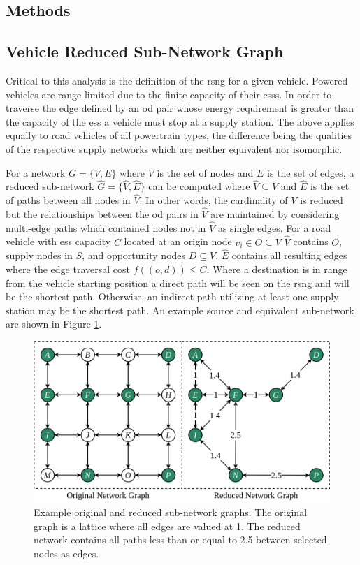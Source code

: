 \documentclass[11pt]{article}
\begin{document}
\begin{multicols}{2}
\section*{Methods}

\subsection*{Vehicle Reduced Sub-Network Graph}

Critical to this analysis is the definition of the \gls{rsng} for a given vehicle. Powered vehicles are range-limited due to the finite capacity of their \glspl{ess}. In order to traverse the edge defined by an \gls{od} pair whose energy requirement is greater than the capacity of the \gls{ess} a vehicle must stop at a supply station. The above applies equally to road vehicles of all powertrain types, the difference being the qualities of the respective supply networks which are neither equivalent nor isomorphic.

For a network $G = \{V, E\}$ where $V$ is the set of nodes and $E$ is the set of edges, a reduced sub-network $\hat{G} = \{\hat{V}, \hat{E}\}$ can be computed where $\hat{V} \subseteq V$ and $\hat{E}$ is the set of paths between all nodes in $\hat{V}$. In other words, the cardinality of $V$ is reduced but the relationships between the \gls{od} pairs in $\hat{V}$ are maintained by considering multi-edge paths which contained nodes not in $\hat{V}$ as single edges. For a road vehicle with \gls{ess} capacity $C$ located at an origin node $v_i \in O \subseteq V$ $\hat{V}$ contains $O$, supply nodes in $S$, and opportunity nodes $D \subseteq V$. $\hat{E}$ contains all resulting edges where the edge traversal cost $f((o, d)) \leq C$. Where a destination is in range from the vehicle starting position a direct path will be seen on the \gls{rsng} and will be the shortest path. Otherwise, an indirect path utilizing at least one supply station may be the shortest path. An example source and equivalent sub-network are shown in Figure \ref{fig:reduced_sub_network_graph}.

\begin{figure}[H]
	\centering
	\includegraphics[width = \linewidth]{figs/reduced_sub_network_graph.png}
	\caption{Example original and reduced sub-network graphs. The original graph is a lattice where all edges are valued at 1. The reduced network contains all paths less than or equal to 2.5 between selected nodes as edges.}
	\label{fig:reduced_sub_network_graph}
\end{figure}


\end{multicols}
\end{document}
